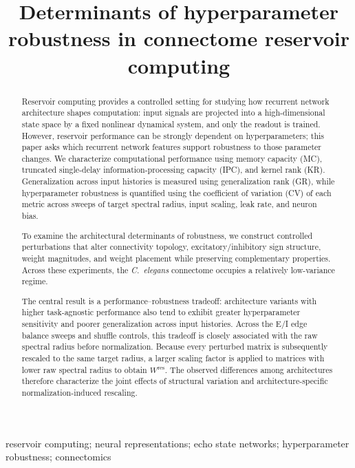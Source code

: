 \documentclass[mlabstract,onecolumn]{jmlr}
\title[Hyperparameter Robustness in Reservoirs]{Determinants of hyperparameter robustness in connectome reservoir computing}
\begin{document}
\maketitle

\begin{abstract}
Reservoir computing provides a controlled setting for studying how recurrent network architecture shapes computation: input signals are projected into a high-dimensional state space by a fixed nonlinear dynamical system, and only the readout is trained. However, reservoir performance can be strongly dependent on hyperparameters; this paper asks which recurrent network features support robustness to those parameter changes. We characterize computational performance using memory capacity (MC), truncated single-delay information-processing capacity (IPC), and kernel rank (KR). Generalization across input histories is measured using generalization rank (GR), while hyperparameter robustness is quantified using the coefficient of variation (CV) of each metric across sweeps of target spectral radius, input scaling, leak rate, and neuron bias.

To examine the architectural determinants of robustness, we construct controlled perturbations that alter connectivity topology, excitatory/inhibitory sign structure, weight magnitudes, and weight placement while preserving complementary properties. Across these experiments, the \textit{C.~elegans} connectome occupies a relatively low-variance regime.

The central result is a performance--robustness tradeoff: architecture variants with higher task-agnostic performance also tend to exhibit greater hyperparameter sensitivity and poorer generalization across input histories. Across the E/I edge balance sweeps and shuffle controls, this tradeoff is closely associated with the raw spectral radius before normalization. Because every perturbed matrix is subsequently rescaled to the same target radius, a larger scaling factor is applied to matrices with lower raw spectral radius to obtain $W^{\mathrm{res}}$. The observed differences among architectures therefore characterize the joint effects of structural variation and architecture-specific normalization-induced rescaling.
\end{abstract}

\begin{keywords}
reservoir computing; neural representations; echo state networks; hyperparameter robustness; connectomics
\end{keywords}
\end{document}
